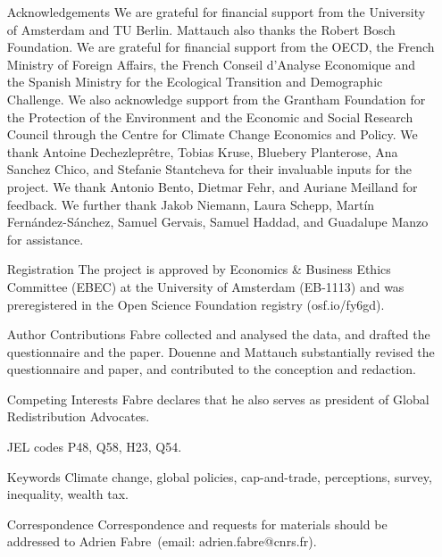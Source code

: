 \begin{itemize}
 \item[Acknowledgements] We are grateful for financial support from the University of Amsterdam and TU Berlin. Mattauch also thanks the Robert Bosch Foundation. We are grateful for financial support from the OECD, the French Ministry of Foreign Affairs, the French Conseil d'Analyse Economique and the Spanish Ministry for the Ecological Transition and Demographic Challenge. We also acknowledge support from the Grantham Foundation for the Protection of the Environment and the Economic and Social Research Council through the Centre for Climate Change Economics and Policy. 
We thank Antoine Dechezleprêtre, Tobias Kruse, Bluebery Planterose, Ana Sanchez Chico, and Stefanie Stantcheva for their invaluable inputs for the project. We thank Antonio Bento, Dietmar Fehr, and Auriane Meilland for feedback. We further thank Jakob Niemann, Laura Schepp, Martín Fernández-Sánchez, Samuel Gervais, Samuel Haddad, and Guadalupe Manzo for assistance. 
 \item[Registration] The project is approved by Economics \& Business Ethics Committee (EBEC) at the University of Amsterdam (EB-1113) and %
 was preregistered in the Open Science Foundation registry (osf.io/fy6gd).
 \item[Author Contributions] Fabre collected and analysed the data, and drafted the questionnaire and the paper. Douenne and Mattauch substantially revised the questionnaire and paper, and contributed to the conception and redaction.
 \item[Competing Interests] Fabre declares that he also serves as president of Global Redistribution Advocates.
\item[JEL codes] P48, Q58, H23, Q54.
\item[Keywords] Climate change, global policies, cap-and-trade, perceptions, survey, inequality, wealth tax.
 \item[Correspondence] Correspondence and requests for materials
should be addressed to Adrien Fabre~(email: adrien.fabre@cnrs.fr).
\end{itemize}

